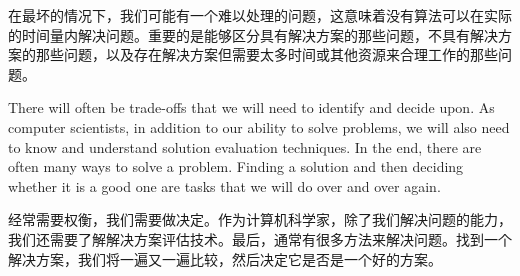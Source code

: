 在最坏的情况下，我们可能有一个难以处理的问题，这意味着没有算法可以在实际的时间量内解决问题。重要的是能够区分具有解决方案的那些问题，不具有解决方案的那些问题，以及存在解决方案但需要太多时间或其他资源来合理工作的那些问题。

There will often be trade-offs that we will need to identify and decide upon. As computer scientists, in addition to our ability to solve problems, we will also need to know and understand solution evaluation techniques. In the end, there are often many ways to solve a problem. Finding a solution and then deciding whether it is a good one are tasks that we will do over and over again.


经常需要权衡，我们需要做决定。作为计算机科学家，除了我们解决问题的能力，我们还需要了解解决方案评估技术。最后，通常有很多方法来解决问题。找到一个解决方案，我们将一遍又一遍比较，然后决定它是否是一个好的方案。
